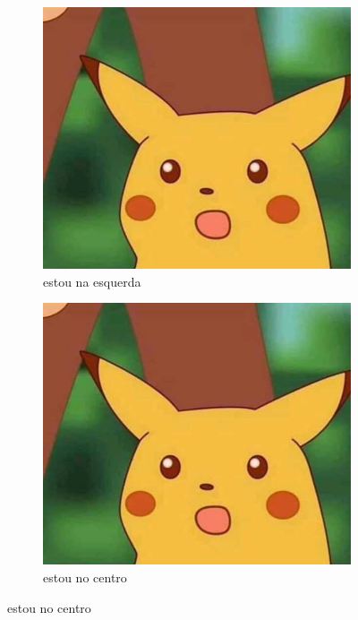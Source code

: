 \begin{figure}[h!]
	\centering
	\begin{subfigure}[b]{0.3\textwidth}
		\centering
		\includegraphics[width=\textwidth]{midia/exemplo}
		\caption{estou na esquerda}
		\label{pika2}
	\end{subfigure}
	\hfill
	\begin{subfigure}[b]{0.3\textwidth}
		\centering
		\includegraphics[width=\textwidth]{midia/exemplo}
		\caption{estou no centro}
		\label{pika3}

\end{subfigure}
\end{figure}
